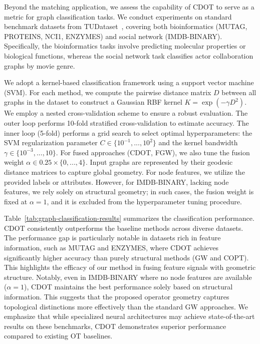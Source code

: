 \documentclass{article}
\theoremstyle{plain}
\theoremstyle{definition}
\theoremstyle{remark}
\begin{document}
Beyond the matching application, we assess the capability of CDOT to serve as a metric for graph classification tasks. We conduct experiments on standard benchmark datasets from TUDataset~\citep{Morris+2020}, covering both bioinformatics (MUTAG, PROTEINS, NCI1, ENZYMES) and social network (IMDB-BINARY). Specifically, the bioinformatics tasks involve predicting molecular properties or biological functions, whereas the social network task classifies actor collaboration graphs by movie genre.

We adopt a kernel-based classification framework using a support vector machine (SVM). For each method, we compute the pairwise distance matrix $D$ between all graphs in the dataset to construct a Gaussian RBF kernel $K = \exp(-\gamma D^2)$. We employ a nested cross-validation scheme to ensure a robust evaluation. The outer loop performs 10-fold stratified cross-validation to estimate accuracy. The inner loop (5-fold) performs a grid search to select optimal hyperparameters: the SVM regularization parameter $C \in \{10^{-1}, ..., 10^2\}$ and the kernel bandwidth $\gamma \in \{10^{-3}, ... , 10\}$. For fused approaches (CDOT, FGW), we also tune the fusion weight $\alpha \in 0.25\times\{0,...,4\}$. Input graphs are represented by their geodesic distance matrices to capture global geometry. For node features, we utilize the provided labels or attributes. However, for IMDB-BINARY, lacking node features, we rely solely on structural geometry; in such cases, the fusion weight is fixed at $\alpha = 1$, and it is excluded from the hyperparameter tuning procedure.

Table~\ref{tab:graph-classification-results} summarizes the classification performance. CDOT consistently outperforms the baseline methods across diverse datasets. The performance gap is particularly notable in datasets rich in feature information, such as MUTAG and ENZYMES, where CDOT achieves significantly higher accuracy than purely structural methods (GW and COPT). This highlights the efficacy of our method in fusing feature signals with geometric structure. Notably, even in IMDB-BINARY where no node features are available ($\alpha=1$), CDOT maintains the best performance solely based on structural information. This suggests that the proposed operator geometry captures topological distinctions more effectively than the standard GW approaches. We emphasize that while specialized neural architectures may achieve state-of-the-art results on these benchmarks, CDOT demonstrates superior performance compared to existing OT baselines.
\end{document}
